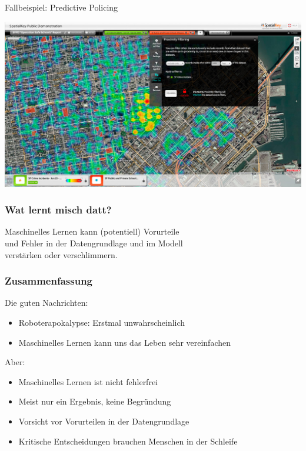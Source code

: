 \documentclass[aspectratio=43,x11names]{beamer}
\begin{document}
\begin{frame}
\frametitle{}
Fallbeispiel: \glqq Predictive Policing\grqq

\begin{center}
\includegraphics[scale=0.25]{images/predictive_policing.jpg} 
\end{center}
\end{frame}

\begin{frame}
\frametitle{Wat lernt misch datt?}
\begin{center}
\color{red}
\large
Maschinelles Lernen kann (potentiell) Vorurteile\\und Fehler
in der Datengrundlage und im Modell\\verstärken oder verschlimmern.
\end{center}
\end{frame}


\begin{frame}
\frametitle{Zusammenfassung}

Die guten Nachrichten:

\begin{itemize}
\color{Green4}
\pause\item Roboterapokalypse: Erstmal unwahrscheinlich
\pause\item Maschinelles Lernen kann uns das Leben sehr vereinfachen
\end{itemize}
\bigskip

Aber:

\begin{itemize}
\color{Firebrick1}
\pause\item Maschinelles Lernen ist nicht fehlerfrei
\pause\item Meist nur ein Ergebnis, keine Begründung
\pause\item Vorsicht vor Vorurteilen in der Datengrundlage
\pause\item Kritische Entscheidungen brauchen Menschen in der Schleife
\end{itemize}

\end{frame}
\end{document}

